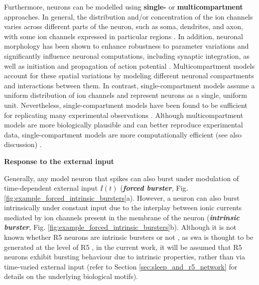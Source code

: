 \documentclass[../main.tex]{subfiles}
\begin{document}
Furthermore, neurons can be modelled using \textbf{single-} or \textbf{multicompartment} approaches.
In general, the distribution and/or concentration of the ion channels varies across different parts of the neuron, such as soma, dendrites, and axon, with some ion channels expressed in particular regions \cite{destexheDendriticLowthresholdCalcium1998,gunayDistalSpikeInitiation2015}.
In addition, neuronal morphology has been shown to enhance robustness to parameter variations and significantly influence neuronal computations, including synaptic integration, as well as initiation and propagation of action potential \cite{destexheDendriticLowthresholdCalcium1998,gunayDistalSpikeInitiation2015,cuntzOneRuleGrow2010}.
Multicompartment models account for these spatial variations by modeling different neuronal compartments and interactions between them. In contrast, single-compartment models assume a uniform distribution of ion channels and represent neurons as a single, uniform unit. Nevertheless, single-compartment models have been found to be sufficient for replicating many experimental observations \cite{wangMultipleDynamicalModes1994,golombContributionPersistentNa2006,destexheDendriticLowthresholdCalcium1998,liuMultipleConductancesCooperatively2008,vickstromTTypeCalciumChannels2020}.
Although multicompartment models are more biologically plausible and can better reproduce experimental data, single-compartment models are more computationally efficient (see also discussion) \cite{destexheDendriticLowthresholdCalcium1998}.


\vspace*{0.3cm}
\noindent\textbf{Response to the external input}

Generally, any model neuron that spikes can also burst under modulation of
time-dependent external input $I(t)$ \parencite{izhikevichDynamicalSystemsNeuroscience2006}
(\textbf{\textit{forced burster}}, Fig. \ref{fig:example_forced_intrinsic_bursters}a).
However, a neuron can also burst intrinsically under constant input due to the interplay
between ionic currents mediated by ion channels present in the membrane of the neuron
(\textbf{\textit{intrinsic burster}}, Fig. \ref{fig:example_forced_intrinsic_bursters}b).
Although it is not known whether R5 neurons are intrinsic bursters or not
\parencite{raccugliaNetworkSpecificSynchronizationElectrical2019}, as \gls{swa}
is thought to be generated at the level of R5 \parencite{raccugliaNetworkSpecificSynchronizationElectrical2019},
in the current work, it will be assumed that R5 neurons exhibit bursting behaviour
due to intrinsic properties, rather than via time-varied external input (refer to Section \ref{sec:sleep_and_r5_network} for details on the underlying biological motifs).
\end{document}
